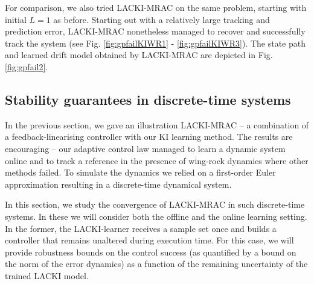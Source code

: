 For comparison, we also tried LACKI-MRAC on the same problem, starting with initial $L=1$ as before. Starting out with a relatively large tracking and prediction error, LACKI-MRAC nonetheless managed to recover and successfully track the system (see  Fig.  \ref{fig:gpfailKIWR1} -  \ref{fig:gpfailKIWR3}). The state path and learned drift model obtained by LACKI-MRAC are depicted in Fig. \ref{fig:gpfail2}.
%
\begin{figure*}
        \centering
   \caption{Depicted are the state path and the drift model learned online by LACKI-MRAC.}
	\label{fig:gpfail2}
\end{figure*}	 


\subsection{Stability guarantees in discrete-time systems}
\label{sec:KIMRACstabbounds}

In the previous section, we gave an illustration LACKI-MRAC -- a combination of a feedback-linearising controller with our KI learning method. The results are encouraging -- our adaptive control law managed to learn a dynamic system online and to track a reference in the presence of wing-rock dynamics where other methods failed. 
To simulate the dynamics we relied on a first-order Euler approximation resulting in a discrete-time dynamical system.

In this section, we study the convergence of LACKI-MRAC in such discrete-time systems.
In these we will consider both the offline and the online learning setting. In the former, the LACKI-learner receives a sample set once and builds a controller that remains unaltered during execution time.
For this case, we will provide robustness bounds on the control success (as quantified by a bound on the norm of the error dynamics) as a function of the remaining uncertainty of the trained LACKI model. 

